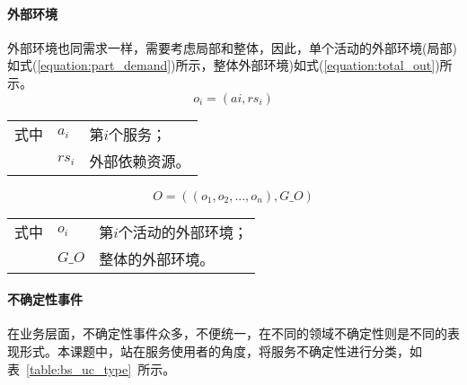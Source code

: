 \paragraph{外部环境}
外部环境也同需求一样，需要考虑局部和整体，因此，单个活动的外部环境(局部)如式(\ref{equation:part_demand})所示，整体外部环境)如式(\ref{equation:total_out})所示。
\begin{equation}\label{equation:part_out}
o_i = \left(ai, rs_i \right)
\end{equation}
\begin{tabularx}{\textwidth}{@{}l@{\quad}l@{\pozhehao }X@{}}
    式中
    & ${a_i}$ & 第${i}$个服务； \\
    & ${rs_i}$ & 外部依赖资源。
\end{tabularx}\vspace{\wordsep}

\begin{equation}\label{equation:total_out}
O = \left((o_1, o_2, ..., o_n), G\_O \right)
\end{equation}
\begin{tabularx}{\textwidth}{@{}l@{\quad}l@{\pozhehao }X@{}}
    式中
    & ${o_i}$ & 第${i}$个活动的外部环境； \\
    & ${G\_O}$ & 整体的外部环境。
\end{tabularx}\vspace{\wordsep}

\paragraph{不确定性事件}
在业务层面，不确定性事件众多，不便统一，在不同的领域不确定性则是不同的表现形式。本课题中，站在服务使用者的角度，将服务不确定性进行分类，如表~\ref{table:bs_uc_type}~所示。


